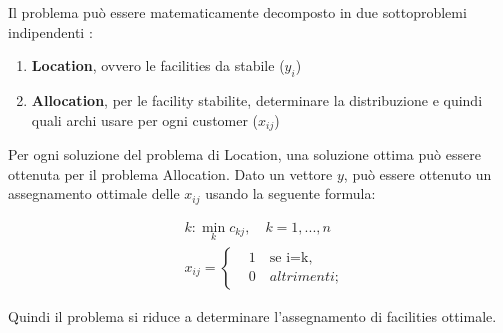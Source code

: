 \documentclass[a4paper,12pt,titlepage,oneside]{article}
\begin{document}
Il problema può essere matematicamente decomposto in due sottoproblemi indipendenti \cite{Sultan1999}:
\begin{enumerate}
\item \textbf{Location}, ovvero le facilities da stabile ($y_{i}$)
\item \textbf{Allocation}, per le facility stabilite, determinare la distribuzione e quindi quali archi usare per ogni customer ($x_{ij}$) 
\end{enumerate}

Per ogni soluzione del problema di Location, una soluzione ottima può essere ottenuta per il problema Allocation. Dato un vettore $y$, può essere ottenuto un assegnamento ottimale delle $x_{ij}$ usando la seguente formula:

\begin{equation*}
\begin{aligned}
& k:\min_{k}c_{kj}, \quad k = 1,...,n \\
& x_{ij}=\left\{\begin{aligned}
& 1 \quad \text{se i=k},\\ 
& 0 \quad altrimenti;
\end{aligned}\right.
\end{aligned}
\end{equation*}

Quindi il problema si riduce a determinare l'assegnamento di facilities ottimale.
\end{document}
